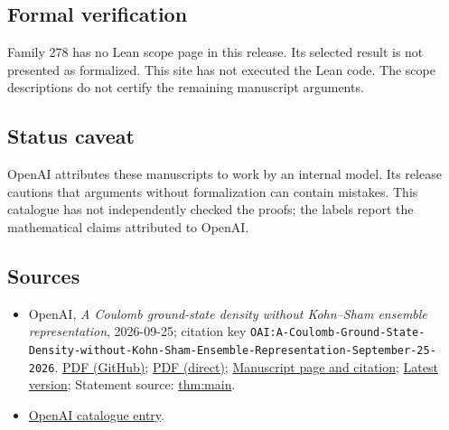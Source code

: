 \documentclass[11pt]{article}
\begin{document}
\subsection{Formal verification}
Family 278 has no Lean scope page in this release. Its selected result is not presented as formalized. This site has not executed the Lean code. The scope descriptions do not certify the remaining manuscript arguments.

\subsection{Status caveat}
OpenAI attributes these manuscripts to work by an internal model. Its release cautions that arguments without formalization can contain mistakes. This catalogue has not independently checked the proofs; the labels report the mathematical claims attributed to OpenAI.

\subsection{Sources}
\begin{itemize}
\item OpenAI, \emph{A Coulomb ground-state density without Kohn–Sham ensemble representation}, 2026-09-25; citation key \texttt{OAI:A-Coulomb-Ground-State-Density-without-Kohn-Sham-Ensemble-Representation-September-25-2026}. \href{https://github.com/openai/math/blob/adc7f1241b42e322a6451854ab7e4b4c146bf78a/preprints/A-Coulomb-Ground-State-Density-without-Kohn-Sham-Ensemble-Representation-September-25-2026/paper.pdf}{PDF (GitHub)}; \href{https://github.com/openai/math/raw/adc7f1241b42e322a6451854ab7e4b4c146bf78a/preprints/A-Coulomb-Ground-State-Density-without-Kohn-Sham-Ensemble-Representation-September-25-2026/paper.pdf}{PDF (direct)}; \href{https://github.com/openai/math/blob/adc7f1241b42e322a6451854ab7e4b4c146bf78a/preprints/A-Coulomb-Ground-State-Density-without-Kohn-Sham-Ensemble-Representation-September-25-2026/README.md}{Manuscript page and citation}; \href{https://github.com/openai/math/blob/main/preprints/A-Coulomb-Ground-State-Density-without-Kohn-Sham-Ensemble-Representation-September-25-2026/paper.pdf}{Latest version}; Statement source: \href{https://github.com/openai/math/blob/adc7f1241b42e322a6451854ab7e4b4c146bf78a/preprints/A-Coulomb-Ground-State-Density-without-Kohn-Sham-Ensemble-Representation-September-25-2026/build/main.tex\#L131}{thm:main}.
\item \href{https://github.com/openai/math/blob/adc7f1241b42e322a6451854ab7e4b4c146bf78a/CONTENTS.md}{OpenAI catalogue entry}.
\end{itemize}
\end{document}
